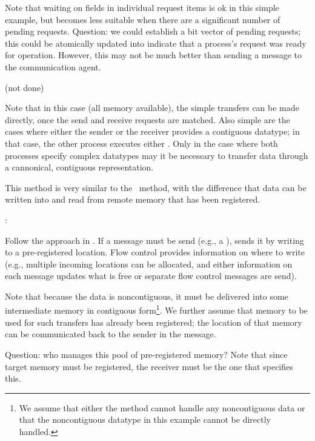 \begin{mmadi}
\begin{shmem}
Note that waiting on fields in individual request items is ok in this simple
example, but becomes less suitable when there are a significant number of
pending requests.  Question: we could establish a bit vector of pending
requests; this could be atomically updated into indicate that a process's
request was ready for operation.  However, this may not be much better than
sending a message to the communication agent.

\end{shmem}

\begin{shmemall}
(not done)

Note that in this case (all memory available), the simple transfers can be
made directly, once the send and receive requests are matched.  Also simple
are the cases where either the sender or the receiver provides a contiguous
datatype; in that case, the other process executes either
 .  Only in the case where both
processes specify complex datatypes may it be necessary to transfer data
through a cannonical, contiguous representation.
\end{shmemall}

\begin{via}
This method is very similar to the \tcpname\ method, with the difference that
data can be written into and read from remote memory that has been registered.

:

Follow the approach in \tcpname.  
If a message must be send (e.g., a
),  sends it by writing to
a pre-registered location.  Flow control provides information on where to
write (e.g., multiple incoming locations can be allocated, and either
information on each message updates what is free or separate flow control
messages are send).   

Note that because the data is noncontiguous, it must be delivered into some
intermediate memory in contiguous form\footnote{We assume that either the
  method cannot handle any noncontiguous data or that the noncontiguous
  datatype in this example cannot be directly handled.}.  We further assume
that memory to be used for such transfers has already been registered; the
location of that memory can be communicated back to the sender in the
 message.  

Question: who manages this pool of pre-registered memory?  Note that since
target memory must be registered, the receiver must be the one that specifies
this.  


\end{via}
\end{mmadi}
